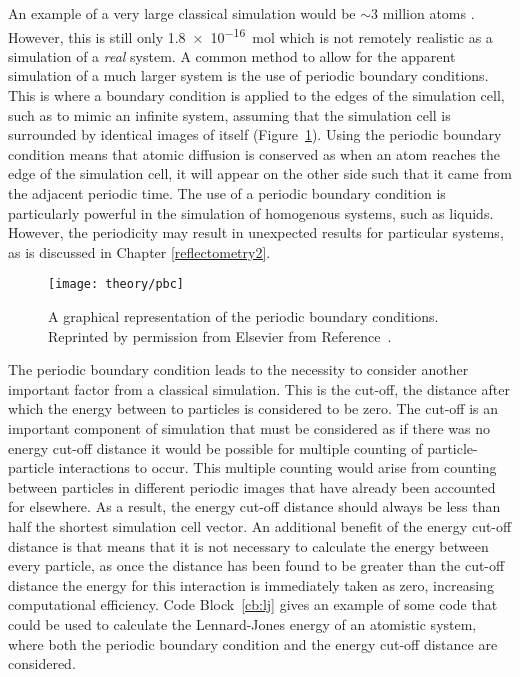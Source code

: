 An example of a very large classical simulation would be $\sim3$ million atoms \cite{gumbart_regulation_2009}.
However, this is still only \SI{1.8e-16}{\mol} which is not remotely realistic as a simulation of a \emph{real} system.
A common method to allow for the apparent simulation of a much larger system is the use of periodic boundary conditions.
This is where a boundary condition is applied to the edges of the simulation cell, such as to mimic an infinite system, assuming that the simulation cell is surrounded by identical images of itself (Figure~\ref{fig:pbc}).
Using the periodic boundary condition means that atomic diffusion is conserved as when an atom reaches the edge of the simulation cell, it will appear on the other side such that it came from the adjacent periodic time.
The use of a periodic boundary condition is particularly powerful in the simulation of homogenous systems, such as liquids.
However, the periodicity may result in unexpected results for particular systems, as is discussed in Chapter \ref{reflectometry2}.
%
\begin{figure}
    \centering
    \texttt{[image: theory/pbc]}
    \caption{A graphical representation of the periodic boundary conditions. Reprinted by permission from Elsevier\textsuperscript{\textcopyright} from Reference~\cite{frenkel_understanding_1996}.}
    \label{fig:pbc}
\end{figure}
%

The periodic boundary condition leads to the necessity to consider another important factor from a classical simulation.
This is the cut-off, the distance after which the energy between to particles is considered to be zero.
The cut-off is an important component of simulation that must be considered as if there was no energy cut-off distance it would be possible for multiple counting of particle-particle interactions to occur.
This multiple counting would arise from counting between particles in different periodic images that have already been accounted for elsewhere.
As a result, the energy cut-off distance should always be less than half the shortest simulation cell vector.
An additional benefit of the energy cut-off distance is that means that it is not necessary to calculate the energy between every particle, as once the distance has been found to be greater than the cut-off distance the energy for this interaction is immediately taken as zero, increasing computational efficiency.
Code Block~\ref{cb:lj} gives an example of some code that could be used to calculate the Lennard-Jones energy of an atomistic system, where both the periodic boundary condition and the energy cut-off distance are considered.
%
\begin{figure}
    \centering
        
\end{figure}
%

